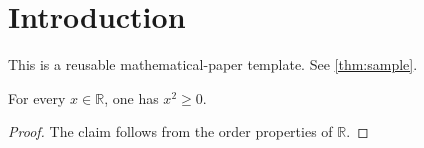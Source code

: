 \section{Introduction}
This is a reusable mathematical-paper template. See \cref{thm:sample}.

\begin{theorem}\label{thm:sample}
For every $x\in\mathbb{R}$, one has $x^2\ge 0$.
\end{theorem}

\begin{proof}
The claim follows from the order properties of $\mathbb{R}$.
\end{proof}
